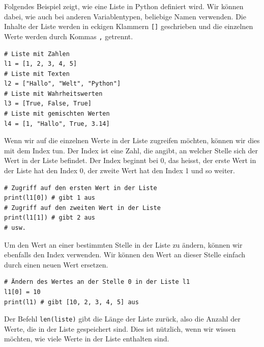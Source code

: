 \begin{myexample}
Folgendes Beispiel zeigt, wie eine Liste in Python definiert wird. Wir können dabei, wie auch bei anderen Variablentypen, beliebige Namen verwenden. Die Inhalte der Liste werden in eckigen Klammern \lstinline|[]| geschrieben und die einzelnen Werte werden durch Kommas \lstinline|,| getrennt.
\begin{lstlisting}
# Liste mit Zahlen  
l1 = [1, 2, 3, 4, 5]
# Liste mit Texten
l2 = ["Hallo", "Welt", "Python"]
# Liste mit Wahrheitswerten
l3 = [True, False, True]
# Liste mit gemischten Werten
l4 = [1, "Hallo", True, 3.14]
\end{lstlisting}
\end{myexample}
\begin{myexample}
Wenn wir auf die einzelnen Werte in der Liste zugreifen möchten, können wir dies mit dem Index tun. Der Index ist eine Zahl, die angibt, an welcher Stelle sich der Wert in der Liste befindet. Der Index beginnt bei 0, das heisst, der erste Wert in der Liste hat den Index 0, der zweite Wert hat den Index 1 und so weiter.
\begin{lstlisting}
# Zugriff auf den ersten Wert in der Liste
print(l1[0]) # gibt 1 aus
# Zugriff auf den zweiten Wert in der Liste
print(l1[1]) # gibt 2 aus
# usw.
\end{lstlisting}
\end{myexample}
\begin{myexample}
Um den Wert an einer bestimmten Stelle in der Liste zu ändern, können wir ebenfalls den Index verwenden. Wir können den Wert an dieser Stelle einfach durch einen neuen Wert ersetzen.
\begin{lstlisting}
# Ändern des Wertes an der Stelle 0 in der Liste l1
l1[0] = 10
print(l1) # gibt [10, 2, 3, 4, 5] aus
\end{lstlisting}
\end{myexample}
\begin{myexample}
Der Befehl \lstinline|len(liste)| gibt die Länge der Liste zurück, also die Anzahl der Werte, die in der Liste gespeichert sind. Dies ist nützlich, wenn wir wissen möchten, wie viele Werte in der Liste enthalten sind.
\end{myexample}

